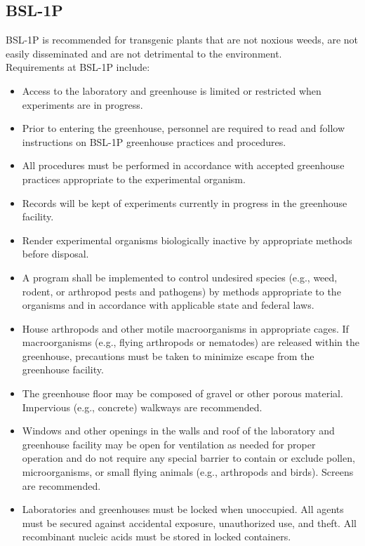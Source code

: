 \subsection{BSL-1P}
BSL-1P is recommended for transgenic plants that are not noxious weeds, are not easily disseminated and are not detrimental to the environment.\\ 
Requirements at BSL-1P include:
\begin{itemize}
    \item Access to the laboratory and greenhouse is limited or restricted when experiments are in progress.
    \item Prior to entering the greenhouse, personnel are required to read and follow instructions on BSL-1P greenhouse practices and procedures.
    \item All procedures must be performed in accordance with accepted greenhouse practices appropriate to the experimental organism.
    \item Records will be kept of experiments currently in progress in the greenhouse facility.
    \item Render experimental organisms biologically inactive by appropriate methods before disposal.
    \item A program shall be implemented to control undesired species (e.g., weed, rodent, or arthropod pests and pathogens) by methods appropriate to the organisms and in accordance with applicable state and federal laws.
    \item House arthropods and other motile macroorganisms in appropriate cages. If macroorganisms (e.g., flying arthropods or nematodes) are released within the greenhouse, precautions must be taken to minimize escape from the greenhouse facility.
    \item The greenhouse floor may be composed of gravel or other porous material. Impervious (e.g., concrete) walkways are recommended.
    \item Windows and other openings in the walls and roof of the laboratory and greenhouse facility may be open for ventilation as needed for proper operation and do not require any special barrier to contain or exclude pollen, microorganisms, or small flying animals (e.g., arthropods and birds). Screens are recommended.
    \item Laboratories and greenhouses must be locked when unoccupied. All agents must be secured against accidental exposure, unauthorized use, and theft. All recombinant nucleic acids must be stored in locked containers.
\end{itemize}
